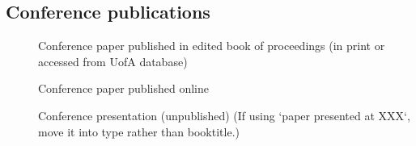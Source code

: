 \documentclass[a4paper]{article}
\begin{document}
\subsection{Conference publications}

\begin{description}
    \item[\citep{laptev2008learning}] Conference paper published in edited book of proceedings (in print or accessed from UofA database)
    \item[\citep{crisp2010assessing}] Conference paper published online
    \item[\citep{butler2009using}] Conference presentation (unpublished) (If using `paper presented at XXX`, move it into type rather than booktitle.)
\end{description}


\end{document}
